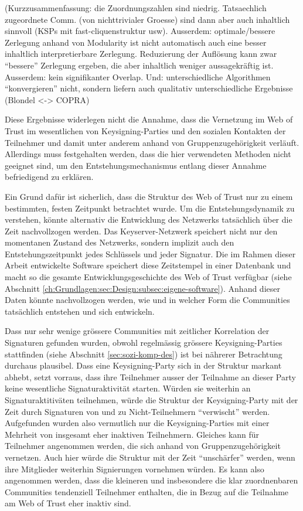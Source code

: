(Kurzzusammenfassung: die Zuordnungszahlen sind niedrig. Tatsaechlich
zugeordnete Comm. (von nichttrivialer Groesse) sind dann aber auch
inhaltlich sinnvoll (KSPs mit fast-cliquenstruktur usw). Ausserdem:
optimale/bessere Zerlegung anhand von Modularity ist nicht automatisch
auch eine besser inhaltlich interpretierbare Zerlegung. Reduzierung
der Aufl\"osung kann zwar ``bessere'' Zerlegung ergeben, die aber
inhaltlich weniger aussagekr\"aftig ist. Ausserdem: kein signifikanter
Overlap. Und: unterschiedliche Algorithmen ``konvergieren'' nicht,
sondern liefern auch qualitativ unterschiedliche Ergebnisse (Blondel
<-> COPRA)

Diese Ergebnisse widerlegen nicht die Annahme, dass die
Vernetzung im Web of Trust im wesentlichen von Keysigning-Parties und
den sozialen Kontakten der Teilnehmer und damit unter anderem anhand
von Gruppenzugeh\"origkeit verl\"auft. Allerdings muss festgehalten
werden, dass die hier verwendeten Methoden nicht geeignet sind, um den
Entstehungsmechanismus entlang dieser Annahme befriedigend zu
erkl\"aren. 

Ein Grund daf\"ur ist sicherlich, dass die Struktur des Web of Trust
nur zu einem bestimmten, festen Zeitpunkt betrachtet wurde. Um die
Entstehungsdynamik zu verstehen, k\"onnte alternativ die Entwicklung
des Netzwerks tats\"achlich \"uber die Zeit nachvollzogen werden. Das
Keyserver-Netzwerk speichert nicht nur den momentanen Zustand des
Netzwerks, sondern implizit auch den Entstehungszeitpunkt jedes
Schl\"ussels und jeder Signatur. Die im Rahmen dieser Arbeit
entwickelte Software speichert diese Zeitstempel in einer Datenbank
und macht so die gesamte Entwicklungsgeschichte des Web of Trust
verf\"ugbar (siehe Abschnitt
\ref{ch:Grundlagen:sec:Design:subsec:eigene-software}). Anhand dieser
Daten k\"onnte nachvollzogen werden, wie und in welcher Form die
Communities tats\"achlich entstehen und sich entwickeln.

Dass nur sehr wenige gr\"ossere Communities mit zeitlicher Korrelation
der Signaturen gefunden wurden, obwohl regelm\"assig gr\"ossere
Keysigning-Parties stattfinden (siehe Abschnitt
\ref{sec:sozi-komp-des}) ist bei n\"ahrerer Betrachtung durchaus
plausibel. Dass eine Keysigning-Party sich in der Struktur markant
abhebt, setzt vorraus, dass ihre Teilnehmer ausser der Teilnahme an
dieser Party keine wesentliche Signaturaktivit\"at starten. W\"urden
sie weiterhin an Signaturaktitiv\"aten teilnehmen, w\"urde die
Struktur der Keysigning-Party mit der Zeit durch Signaturen von und zu
Nicht-Teilnehmern ``verwischt'' werden. Aufgefunden wurden also
vermutlich nur die Keysigning-Parties mit einer Mehrheit von insgesamt
eher inaktiven Teilnehmern. Gleiches kann f\"ur Teilnehmer angenommen
werden, die sich anhand von Gruppenzugeh\"origkeit vernetzen. Auch
hier w\"urde die Struktur mit der Zeit ``unsch\"arfer'' werden, wenn
ihre Mitglieder weiterhin Signierungen vornehmen w\"urden. Es kann
also angenommen werden, dass die kleineren und insbesondere die klar
zuordnenbaren Communities tendenziell Teilnehmer enthalten, die in
Bezug auf die Teilnahme am Web of Trust eher inaktiv sind. 

